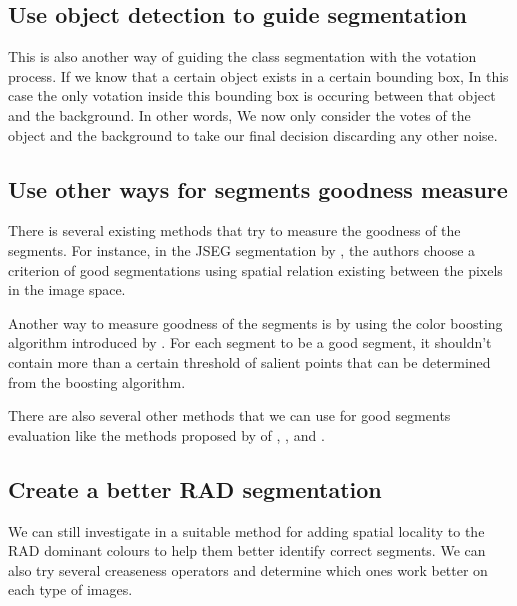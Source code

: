 \documentclass[twoside,11pt]{article}
\begin{document}
\subsection{Use object detection to guide segmentation}

This is also another way of guiding the class segmentation with the votation
process. If we know that a certain object exists in a certain
bounding box, In this case the only votation inside this bounding box is
occuring between that object and the background. In other words,
We now only consider the votes of the object and the background to take our
final decision discarding any other noise.

\subsection{Use other ways for segments goodness measure}

There is several existing methods that try to measure the goodness of the
segments. For instance, in the JSEG segmentation by \cite{jseg:462311},
the authors choose a criterion of good segmentations using spatial relation
existing between the pixels in the image space.

Another way to measure goodness of the segments is by using the color boosting
algorithm introduced by \cite{Weijer05boostingcolor}. For each
segment to be a good segment, it shouldn't contain more than a certain threshold
of salient points that can be determined from the boosting
algorithm.

There are also several other methods that we can use for good segments
evaluation like the methods proposed by of \cite{1285194},
\cite{1153499}, \cite{Cheng02colorimage} and \cite{Hanbury06automaticimage}.

\subsection{Create a better RAD segmentation}

We can still investigate in a suitable method for adding spatial locality to the
RAD dominant colours to help them better identify correct segments.
We can also try several creaseness operators and determine which ones work
better on each type of images.




\newpage




\vskip 0.2in

\end{document}
